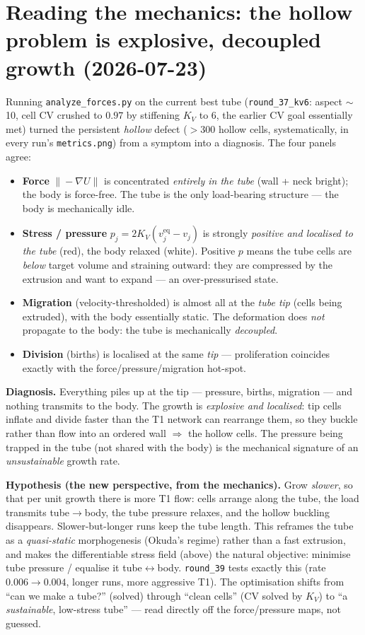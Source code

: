 \documentclass[11pt]{article}
\begin{document}
\section{Reading the mechanics: the hollow problem is explosive, decoupled growth (2026-07-23)}
Running \texttt{analyze\_forces.py} on the current best tube (\texttt{round\_37\_kv6}: aspect $\sim$10, cell
CV crushed to $0.97$ by stiffening $K_V$ to $6$, the earlier CV goal essentially met) turned the persistent
\emph{hollow} defect ($>300$ hollow cells, systematically, in every run's \texttt{metrics.png}) from a
symptom into a diagnosis. The four panels agree:
\begin{itemize}\itemsep2pt
\item \textbf{Force} $\|\!-\!\nabla U\|$ is concentrated \emph{entirely in the tube} (wall + neck bright); the
body is force-free. The tube is the only load-bearing structure --- the body is mechanically idle.
\item \textbf{Stress / pressure} $p_j=2K_V(v_j^{\text{eq}}-v_j)$ is strongly \emph{positive and localised to
the tube} (red), the body relaxed (white). Positive $p$ means the tube cells are \emph{below} target volume
and straining outward: they are compressed by the extrusion and want to expand --- an over-pressurised state.
\item \textbf{Migration} (velocity-thresholded) is almost all at the \emph{tube tip} (cells being extruded),
with the body essentially static. The deformation does \emph{not} propagate to the body: the tube is
mechanically \emph{decoupled}.
\item \textbf{Division} (births) is localised at the same \emph{tip} --- proliferation coincides exactly with
the force/pressure/migration hot-spot.
\end{itemize}
\textbf{Diagnosis.} Everything piles up at the tip --- pressure, births, migration --- and nothing transmits
to the body. The growth is \emph{explosive and localised}: tip cells inflate and divide faster than the T1
network can rearrange them, so they buckle rather than flow into an ordered wall $\Rightarrow$ the hollow
cells. The pressure being trapped in the tube (not shared with the body) is the mechanical signature of an
\emph{unsustainable} growth rate.

\textbf{Hypothesis (the new perspective, from the mechanics).} Grow \emph{slower}, so that per unit growth
there is more T1 flow: cells arrange along the tube, the load transmits tube$\rightarrow$body, the tube
pressure relaxes, and the hollow buckling disappears. Slower-but-longer runs keep the tube length. This
reframes the tube as a \emph{quasi-static} morphogenesis (Okuda's regime) rather than a fast extrusion, and
makes the differentiable stress field (above) the natural objective: minimise tube pressure / equalise it
tube$\leftrightarrow$body. \texttt{round\_39} tests exactly this (rate $0.006\!\to\!0.004$, longer runs, more
aggressive T1). The optimisation shifts from ``can we make a tube?'' (solved) through ``clean cells''
(CV solved by $K_V$) to ``a \emph{sustainable}, low-stress tube'' --- read directly off the force/pressure
maps, not guessed.
\end{document}
